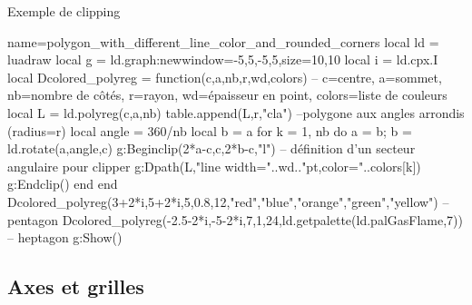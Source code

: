 \begin{demo}{Exemple de clipping}
\begin{luadraw}{name=polygon_with_different_line_color_and_rounded_corners}
local ld = luadraw
local g = ld.graph:new{window={-5,5,-5,5},size={10,10}}
local i = ld.cpx.I
local Dcolored_polyreg = function(c,a,nb,r,wd,colors)
-- c=centre, a=sommet, nb=nombre de côtés, r=rayon, wd=épaisseur en point, colors=liste de couleurs
    local L = ld.polyreg(c,a,nb)
    table.append(L,{r,"cla"}) --polygone aux angles arrondis (radius=r)
    local angle = 360/nb
    local b = a
    for k = 1, nb do
        a = b; b = ld.rotate(a,angle,c)
        g:Beginclip({2*a-c,c,2*b-c,"l"}) -- définition d'un secteur angulaire pour clipper
        g:Dpath(L,"line width="..wd.."pt,color="..colors[k])
        g:Endclip()
    end
end
Dcolored_polyreg(3+2*i,5+2*i,5,0.8,12,{"red","blue","orange","green","yellow"}) -- pentagon
Dcolored_polyreg(-2.5-2*i,-5-2*i,7,1,24,ld.getpalette(ld.palGasFlame,7)) -- heptagon
g:Show()
\end{luadraw}
\end{demo}


\subsection{Axes et grilles}

